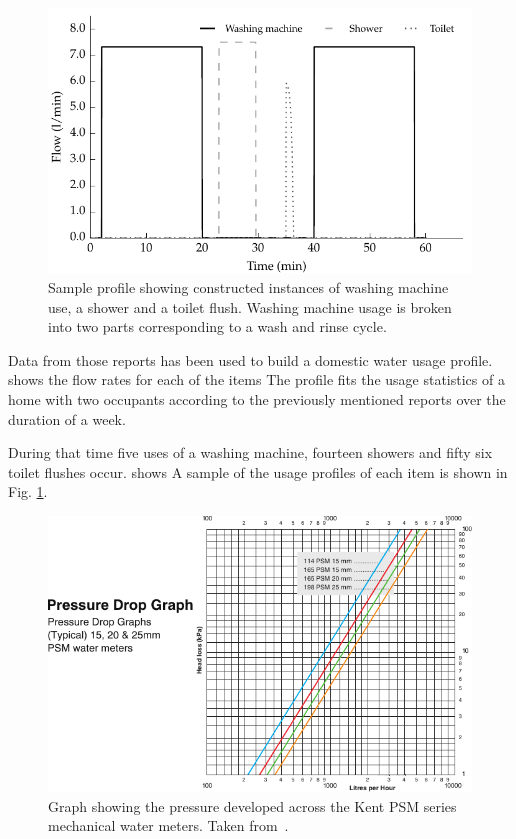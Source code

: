    \begin{figure}
      \centering
      \includegraphics[width=\linewidth]{content/pt1/02-WirelessWaterMeter/graphics/graph_profile}
      \caption{Sample profile showing constructed instances of washing machine use, a shower and a toilet flush.
      Washing machine usage is broken into two parts corresponding to a wash and rinse cycle.}
      \label{fig:profileSample}
    \end{figure}

    Data from those reports has been used to build a domestic water usage profile.
     shows the flow rates for each of the items
    The profile fits the usage statistics of a home with two occupants according to the previously mentioned reports over the duration of a week.

    During that time five uses of a washing machine, fourteen showers and fifty six toilet flushes occur.
     shows
    A sample of the usage profiles of each item is shown in Fig. \ref{fig:profileSample}.

    \begin{figure}
        \centering
        \includegraphics[width=\linewidth]{content/pt1/02-WirelessWaterMeter/graphics/Kent-PSM-HeadLoss}
        \caption{Graph showing the pressure developed across the Kent PSM series mechanical water meters. Taken from~\cite{Elster2008}.}
        \label{fig:headloss}
    \end{figure}

